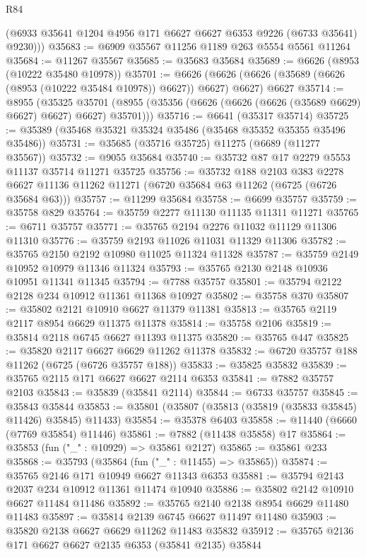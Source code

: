 \begin{lexlean}{R84}
\begin{coremodule}
        (@6933 @35641 @1204 @4956 @171 @6627 @6627 @6353 @9226 (@6733 @35641) @9230)))
@35683 := @6909 @35567 @11256 @1189 @263 @5554 @5561 @11264
@35684 := @11267 @35567
@35685 := @35683 @35684
@35689 := @6626 (@8953 (@10222 @35480 @10978))
@35701 := @6626
    (@6626 (@6626 (@35689 (@6626 (@8953 (@10222 @35484 @10978)) @6627)) @6627) @6627)
    @6627
@35714 := @8955
    (@35325 @35701 (@8955 (@35356 (@6626 (@6626 (@6626 (@35689 @6629) @6627) @6627) @6627) @35701)))
@35716 := @6641 (@35317 @35714)
@35725 := @35389 (@35468 @35321 @35324 @35486 (@35468 @35352 @35355 @35496 @35486))
@35731 := @35685 (@35716 @35725) @11275 (@6689 (@11277 @35567))
@35732 := @9055 @35684
@35740 := @35732 @87 @17 @2279 @5553 @11137 @35714 @11271 @35725
@35756 := @35732
    @188
    @2103
    @383
    @2278
    @6627
    @11136
    @11262
    @11271
    (@6720 @35684 @63 @11262 (@6725 (@6726 @35684 @63)))
@35757 := @11299 @35684
@35758 := @6699 @35757
@35759 := @35758 @829
@35764 := @35759 @2277 @11130 @11135 @11311 @11271
@35765 := @6711 @35757
@35771 := @35765 @2194 @2276 @11032 @11129 @11306 @11310
@35776 := @35759 @2193 @11026 @11031 @11329 @11306
@35782 := @35765 @2150 @2192 @10980 @11025 @11324 @11328
@35787 := @35759 @2149 @10952 @10979 @11346 @11324
@35793 := @35765 @2130 @2148 @10936 @10951 @11341 @11345
@35794 := @7788 @35757
@35801 := @35794 @2122 @2128 @234 @10912 @11361 @11368 @10927
@35802 := @35758 @370
@35807 := @35802 @2121 @10910 @6627 @11379 @11381
@35813 := @35765 @2119 @2117 @8954 @6629 @11375 @11378
@35814 := @35758 @2106
@35819 := @35814 @2118 @6745 @6627 @11393 @11375
@35820 := @35765 @447
@35825 := @35820 @2117 @6627 @6629 @11262 @11378
@35832 := @6720 @35757 @188 @11262 (@6725 (@6726 @35757 @188))
@35833 := @35825 @35832
@35839 := @35765 @2115 @171 @6627 @6627 @2114 @6353
@35841 := @7882 @35757 @2103
@35843 := @35839 (@35841 @2114)
@35844 := @6733 @35757
@35845 := @35843 @35844
@35853 := @35801 (@35807 (@35813 (@35819 (@35833 @35845) @11426) @35845) @11433)
@35854 := @35378 @6403
@35858 := @11440 (@6660 (@7769 @35854) @11446)
@35861 := @7882 (@11438 @35858) @17
@35864 := @35853 (fun ("_" : @10929) => @35861 @2127)
@35865 := @35861 @233
@35868 := @35793 (@35864 (fun ("_" : @11455) => @35865))
@35874 := @35765 @2146 @171 @10949 @6627 @11343 @6353
@35881 := @35794 @2143 @2037 @234 @10912 @11361 @11474 @10940
@35886 := @35802 @2142 @10910 @6627 @11484 @11486
@35892 := @35765 @2140 @2138 @8954 @6629 @11480 @11483
@35897 := @35814 @2139 @6745 @6627 @11497 @11480
@35903 := @35820 @2138 @6627 @6629 @11262 @11483 @35832
@35912 := @35765 @2136 @171 @6627 @6627 @2135 @6353 (@35841 @2135) @35844

\end{coremodule}
\end{lexlean}
